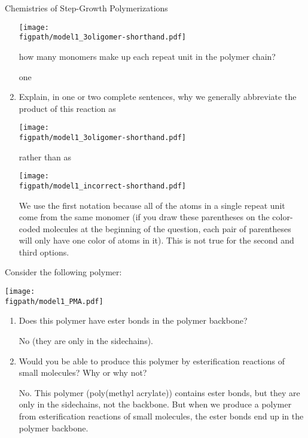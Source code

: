 \begin{activity}{Chemistries of Step-Growth Polymerizations}
\begin{ctqs}
\begin{enumerate}
	\centerline{\texttt{[image: \\figpath/model1\_3oligomer-shorthand.pdf]}}
	\vspace{-3pt}
	how many monomers make up each repeat unit in the polymer chain?
			
				\begin{solution}[1in]
					one
				\end{solution}
		
			\item Explain, in one or two complete sentences, why we generally abbreviate the product of this reaction as
	
	\centerline{\texttt{[image: \\figpath/model1\_3oligomer-shorthand.pdf]}}
	
	rather than as
	
	\centerline{\texttt{[image: \\figpath/model1\_incorrect-shorthand.pdf]}}
			
				\begin{solution}[2in]
					We use the first notation because all of the atoms in a single repeat unit come from the same monomer (if you draw these parentheses on the color-coded molecules at the beginning of the question, each pair of parentheses will only have one color of atoms in it).  This is not true for the second and third options.
				\end{solution}
			
		\end{enumerate}
	
	\question Consider the following polymer:
	
	\centerline{\texttt{[image: \\figpath/model1\_PMA.pdf]}}
	
		\begin{enumerate}
				
			\item Does this polymer have ester bonds in the polymer backbone?
			
				\begin{solution}[0.75in]
					No (they are only in the sidechains).
				\end{solution}
		
			\item Would you be able to produce this polymer by esterification reactions of small molecules?  Why or why not?
			
				\begin{solution}[2in]
					No.  This polymer (poly(methyl acrylate)) contains ester bonds, but they are only in the sidechains, not the backbone.  But when we produce a polymer from esterification reactions of small molecules, the ester bonds end up in the polymer backbone.
					

\end{solution}
\end{enumerate}
\end{ctqs}
\end{activity}
